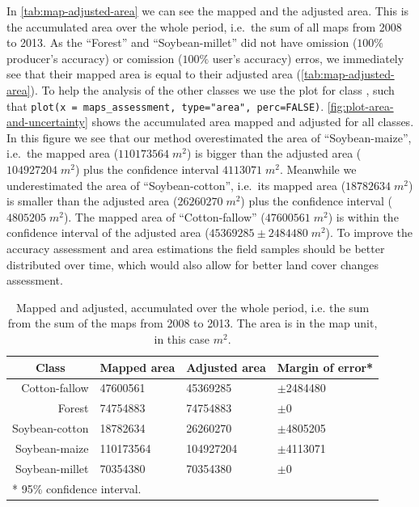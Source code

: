 \documentclass[article,shortnames]{jss}
\begin{document}
In \autoref{tab:map-adjusted-area} we can see the mapped and the
adjusted area. This is the accumulated area over the whole period,
i.e.~the sum of all maps from 2008 to 2013. As the ``Forest'' and
``Soybean-millet'' did not have omission (\(100\%\) producer's accuracy)
or comission (\(100\%\) user's accuracy) erros, we immediately see that
their mapped area is equal to their adjusted area
(\autoref{tab:map-adjusted-area}). To help the analysis of the other
classes we use the plot  for class
, such that
\texttt{plot(x\ =\ maps\_assessment,\ type="area",\ perc=FALSE)}.
\autoref{fig:plot-area-and-uncertainty} shows the accumulated area
mapped and adjusted for all classes. In this figure we see that our
method overestimated the area of ``Soybean-maize'', i.e.~the mapped area
(\(110173564\;m^2\)) is bigger than the adjusted area
(\(104927204\;m^2\)) plus the confidence interval \(4113071\;m^2\).
Meanwhile we underestimated the area of ``Soybean-cotton'', i.e.~its
mapped area (\(18782634\;m^2\)) is smaller than the adjusted area
(\(26260270\;m^2\)) plus the confidence interval (\(4805205\;m^2\)). The
mapped area of ``Cotton-fallow'' (\(47600561\;m^2\)) is within the
confidence interval of the adjusted area (\(45369285\pm2484480\;m^2\)).
To improve the accuracy assessment and area estimations the field
samples should be better distributed over time, which would also allow
for better land cover changes assessment.

\begin{table}[!ht]
\centering
\begin{tabular}{rlll}
  \hline
  \multicolumn{1}{c}{Class} & Mapped area & Adjusted area & Margin of error*\\
 \hline
Cotton-fallow & 47600561 & 45369285 & $\pm$2484480 \\ 
  Forest & 74754883 & 74754883 & $\pm$0 \\ 
  Soybean-cotton & 18782634 & 26260270 & $\pm$4805205 \\ 
  Soybean-maize & 110173564 & 104927204 & $\pm$4113071 \\ 
  Soybean-millet & 70354380 & 70354380 & $\pm$0 \\ 
   \hline 
\multicolumn{3}{l}{* 95\% confidence interval.}
\end{tabular}
\caption{\label{tab:map-adjusted-area}Mapped and adjusted, accumulated over the whole period, i.e. the sum from the sum of the maps from 2008 to 2013. The area is in the map unit, in this case $m^2$.} 
\end{table}
\end{document}
